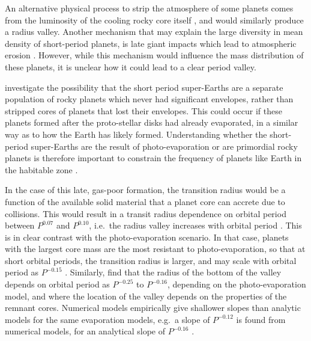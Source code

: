 \documentclass[a4paper,fleqn,usenatbib]{mnras}
\begin{document}
An alternative physical process to strip the atmosphere of some planets comes from the luminosity of the cooling rocky core itself \citep{ginzburg2018}, and would similarly produce a radius valley. Another mechanism that may explain the large diversity in mean density of short-period planets, is late giant impacts which lead to atmospheric erosion \citep[e.g.][]{liu2015,inamdar2016}. However, while this mechanism would influence the mass distribution of these planets, it is unclear how it could lead to a clear period valley. 

\cite{lopez2016} investigate the possibility that the short period super-Earths are a separate population of rocky planets which never had significant envelopes, rather than stripped cores of planets that lost their envelopes. This could occur if these planets formed after the proto-stellar disks had already evaporated, in a similar way as to how the Earth has likely formed. Understanding whether the short-period super-Earths are the result of photo-evaporation or are primordial rocky planets is therefore important to constrain the frequency of planets like Earth in the habitable zone \citep{lopez2016}. 

In the case of this late, gas-poor formation, the transition radius would be a function of the available solid material that a planet core can accrete due to collisions. This would result in a transit radius dependence on orbital period between $P^{0.07}$ and $P^{0.10}$, i.e.\ the radius valley increases with orbital period \citep{lopez2016}. This is in clear contrast with the photo-evaporation scenario. In that case, planets with the largest core mass are the most resistant to photo-evaporation, so that at short orbital periods, the transition radius is larger, and may scale with orbital period as $P^{-0.15}$ \citep{lopez2016}. Similarly, \cite{owen2017} find that the radius of the bottom of the valley depends on orbital period as $P^{-0.25}$ to $P^{-0.16}$, depending on the photo-evaporation model, and where the location of the valley depends on the properties of the remnant cores. Numerical models empirically give shallower slopes than analytic models for the same evaporation models, e.g.\ a slope of $P^{-0.12}$ is found from numerical models, for an analytical slope of $P^{-0.16}$ \citep{owen2013}.
\end{document}
